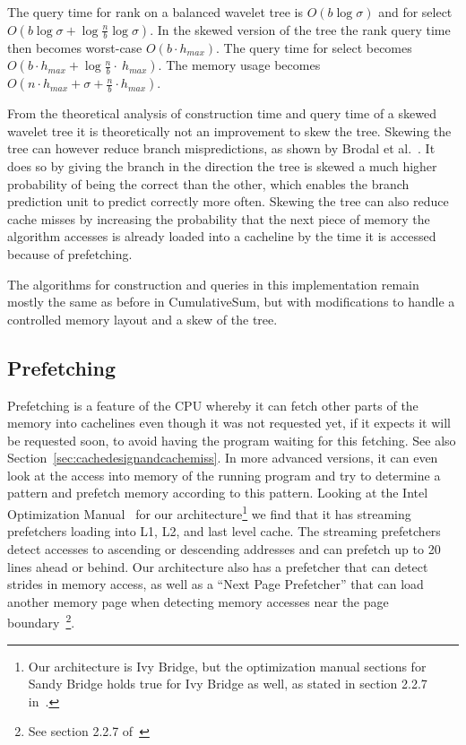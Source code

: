 The query time for rank on a balanced wavelet tree is $O(b \log \sigma)$ and for select $O(b \log \sigma + \log \frac{n}{b} \log \sigma)$.
In the skewed version of the tree the rank query time then becomes worst-case $O(b \cdot h_{max})$. The query time for select becomes $O(b \cdot h_{max} + \log \frac{n}{b} \cdot~h_{max})$.
The memory usage becomes $O(n \cdot h_{max} + \sigma + \frac{n}{b} \cdot h_{max})$.


From the theoretical analysis of construction time and query time of a skewed wavelet tree it is theoretically not an improvement to skew the tree.
Skewing the tree can however reduce branch mispredictions, as shown by Brodal et al.~.
It does so by giving the branch in the direction the tree is skewed a much higher probability of being the correct than the other, which enables the branch prediction unit to predict correctly more often. 
Skewing the tree can also reduce cache misses by increasing the probability that the next piece of memory the algorithm accesses is already loaded into a cacheline by the time it is accessed because of prefetching.

The algorithms for construction and queries in this implementation remain mostly the same as before in CumulativeSum, but with modifications to handle a controlled memory layout and a skew of the tree.

\subsection{Prefetching}
Prefetching is a feature of the CPU whereby it can fetch other parts of the memory into cachelines even though it was not requested yet, if it expects it will be requested soon, to avoid having the program waiting for this fetching.
See also Section~\ref{sec:cachedesignandcachemiss}.
In more advanced versions, it can even look at the access into memory of the running program and try to determine a pattern and prefetch memory according to this pattern.
Looking at the Intel Optimization Manual~ for our architecture\footnote{Our architecture is Ivy Bridge, but the optimization manual sections for Sandy Bridge holds true for Ivy Bridge as well, as stated in section 2.2.7 in~.} we find that it has streaming prefetchers loading into L1, L2, and last level cache. The streaming prefetchers detect accesses to ascending or descending addresses and can prefetch up to 20 lines ahead or behind. 
Our architecture also has a prefetcher that can detect strides in memory access, as well as a “Next Page Prefetcher” that can load another memory page when detecting memory accesses near the page boundary~\footnote{See section 2.2.7 of~}.


